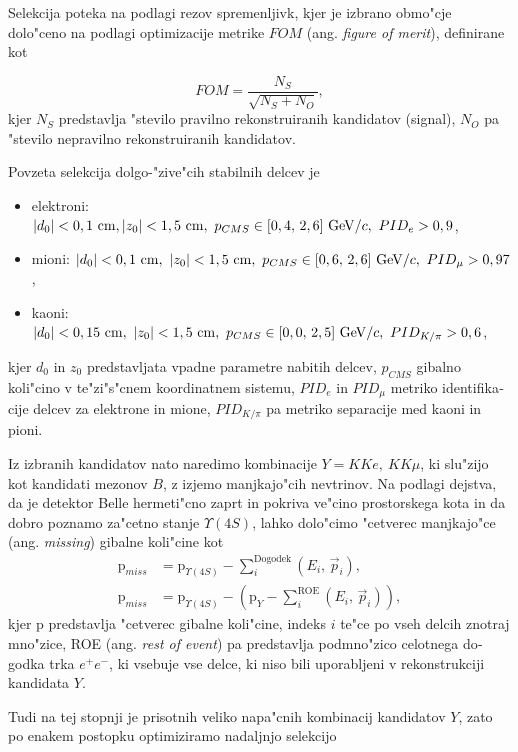 \begin{otherlanguage}{slovene}
Selekcija poteka na podlagi rezov spremenljivk, kjer je izbrano obmo"cje dolo"ceno na podlagi optimizacije metrike $FOM$ (ang. \textit{figure of merit}), definirane kot 

\begin{equation}
FOM = \frac{N_S}{\sqrt{N_S + N_O}},
\end{equation}
kjer $N_S$ predstavlja "stevilo pravilno rekonstruiranih kandidatov (signal), $N_O$ pa "stevilo nepravilno rekonstruiranih kandidatov.

Povzeta selekcija dolgo-"zive"cih stabilnih delcev je
\begin{itemize}
\item elektroni: $\vert d_0 \vert < 0,1\mathrm{~cm}, \vert z_0 \vert < 1,5\mathrm{~cm},~p_{CMS} \in [0,4,\,2,6]\mathrm{~GeV}/c,~PID_e > 0,9$,
\item mioni: $\vert d_0 \vert < 0,1\mathrm{~cm},~\vert z_0 \vert < 1,5\mathrm{~cm},~p_{CMS} \in [0,6,\,2,6]\mathrm{~GeV}/c,~PID_\mu > 0,97$,
\item kaoni: $\vert d_0 \vert < 0,15\mathrm{~cm},~\vert z_0 \vert < 1,5\mathrm{~cm},~p_{CMS} \in [0,0,\,2,5]\mathrm{~GeV}/c,~PID_{K/\pi} > 0,6$,
\end{itemize}
kjer $d_0$ in $z_0$ predstavljata vpadne parametre nabitih delcev, $p_{CMS}$ gibalno koli"cino v te"zi"s"cnem koordinatnem sistemu, $PID_e$ in $PID_\mu$ metriko identifikacije delcev za elektrone in mione, $PID_{K/\pi}$ pa metriko separacije med kaoni in pioni.

Iz izbranih kandidatov nato naredimo kombinacije $Y = KKe,~KK\mu$, ki slu"zijo kot kandidati mezonov $B$, z izjemo manjkajo"cih nevtrinov. Na podlagi dejstva, da je detektor Belle hermeti"cno zaprt in pokriva ve"cino prostorskega kota in da dobro poznamo za"cetno stanje $\Upsilon(4S)$, lahko dolo"cimo "cetverec manjkajo"ce (ang. \textit{missing}) gibalne koli"cine kot
\begin{align}
\mathrm{p}_{miss} &= \mathrm{p}_{\Upsilon(4S)} - \sum_i^{\mathrm{Dogodek}}\left(E_i,\,\vec{p}_i \right),\\
\label{eq:ROEloop_si}
\mathrm{p}_{miss} &= \mathrm{p}_{\Upsilon(4S)} - \left(\mathrm{p}_{Y} -\sum_i^{\mathrm{ROE}}\left(E_i,\,\vec{p}_i \right)\right),
\end{align}
kjer $\mathrm{p}$ predstavlja "cetverec gibalne koli"cine, indeks $i$ te"ce po vseh delcih znotraj mno"zice, ROE (ang. \textit{rest of event}) pa predstavlja podmno"zico celotnega dogodka trka $e^+e^-$, ki vsebuje vse delce, ki niso bili uporabljeni v rekonstrukciji kandidata $Y$.

Tudi na tej stopnji je prisotnih veliko napa"cnih kombinacij kandidatov $Y$, zato po enakem postopku optimiziramo nadaljnjo selekcijo


\end{otherlanguage}
